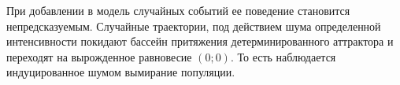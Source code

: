         

        

    При добавлении в модель случайных событий ее поведение становится непредсказуемым. Случайные траектории, под действием шума определенной интенсивности покидают бассейн притяжения детерминированного аттрактора и переходят на вырожденное равновесие \((0; 0)\). То есть наблюдается индуцированное шумом вымирание популяции. 
